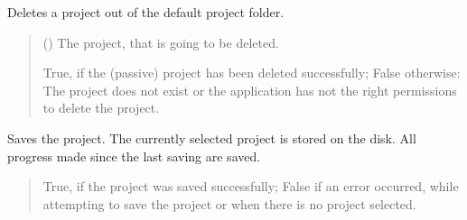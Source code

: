 \documentclass[letterpaper,10pt,english]{sphinxmanual}
\begin{document}
\begin{fulllineitems}
\begin{fulllineitems}
\begin{quote}
\begin{description}
\end{description}\end{quote}

\end{fulllineitems}


\begin{fulllineitems}
\label{\detokenize{apidoc/src.osm_configurator.control:src.osm_configurator.control.project_controller.ProjectController.delete_passive_project}}
\pysigstartsignatures
{}
\pysigstopsignatures
\sphinxAtStartPar
Deletes a project out of the default project folder.
\begin{quote}\begin{description}
\sphinxAtStartPar
{} ({\hyperref[\detokenize{apidoc/src.osm_configurator.model.application:src.osm_configurator.model.application.passive_project.PassiveProject}]{}}) \textendash{} The project, that is going to be deleted.

\sphinxAtStartPar
True, if the (passive) project has been deleted successfully; False otherwise: The project does not exist or the application has not the right permissions to delete the project.

\sphinxAtStartPar
{}

\end{description}\end{quote}

\end{fulllineitems}


\begin{fulllineitems}
\label{\detokenize{apidoc/src.osm_configurator.control:src.osm_configurator.control.project_controller.ProjectController.save_project}}
\pysigstartsignatures
{}
\pysigstopsignatures
\sphinxAtStartPar
Saves the project.
The currently selected project is stored on the disk. All progress made since the last saving are saved.
\begin{quote}\begin{description}
\sphinxAtStartPar
True, if the project was saved successfully; False if an error occurred, while attempting to save the project or when there is no project selected.


\end{description}
\end{quote}
\end{fulllineitems}
\end{fulllineitems}
\end{document}
